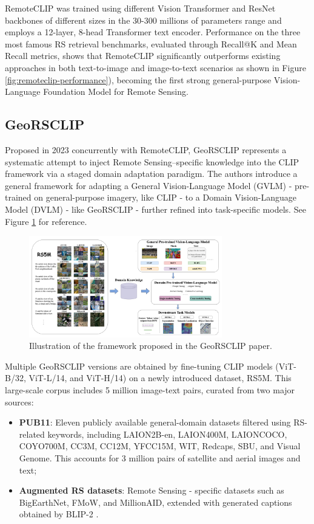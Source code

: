 \documentclass[a4paper, oneside, english]{sapthesis} %
\begin{document}
RemoteCLIP was trained using different Vision Transformer and ResNet backbones of different sizes in the 30-300 millions of parameters range and employs a 12-layer, 8-head Transformer text encoder. Performance on the three most famous RS retrieval benchmarks, evaluated through Recall@K and Mean Recall metrics, shows that RemoteCLIP significantly outperforms existing approaches in both text-to-image and image-to-text scenarios as shown in Figure \ref{fig:remoteclip-performance}), becoming the first strong general-purpose Vision-Language Foundation Model for Remote Sensing.

\subsection{GeoRSCLIP}

Proposed in 2023 concurrently with RemoteCLIP, GeoRSCLIP \cite{zhang2024rs5m} represents a systematic attempt to inject Remote Sensing–specific knowledge into the CLIP framework via a staged domain adaptation paradigm. The authors introduce a general framework for adapting a General Vision-Language Model (GVLM) - pre-trained on general-purpose imagery, like CLIP - to a Domain Vision-Language Model (DVLM) - like GeoRSCLIP - further refined into task-specific models. See Figure \ref{fig:georsclip-framework} for reference.

\begin{figure}[h]
    \centering
    \includegraphics[width=0.75\textwidth]{img/georsclip-framework.png}
    \caption{Illustration of the framework proposed in the GeoRSCLIP paper.}
    \label{fig:georsclip-framework}
\end{figure}

Multiple GeoRSCLIP versions are obtained by fine-tuning CLIP models (ViT-B/32, ViT-L/14, and ViT-H/14) on a newly introduced dataset, RS5M. This large-scale corpus includes 5 million image-text pairs, curated from two major sources:

\begin{itemize}
    \item \textbf{PUB11}: Eleven publicly available general-domain datasets filtered using RS-related keywords, including LAION2B-en, LAION400M, LAIONCOCO, COYO700M, CC3M, CC12M, YFCC15M, WIT, Redcaps, SBU, and Visual Genome. This accounts for 3 million pairs of satellite and aerial images and text;
    \item \textbf{Augmented RS datasets}: Remote Sensing - specific datasets such as BigEarthNet, FMoW, and MillionAID, extended with generated captions obtained by BLIP-2 \cite{li2023blip}.
\end{itemize}
\end{document}
